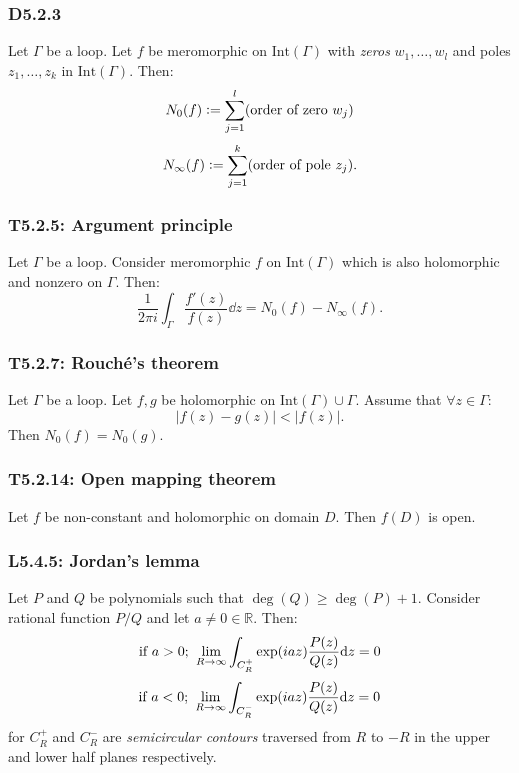 \documentclass{article}
\newcommand{\deq}{\vcentcolon=}
\begin{document}
\begin{multicols*}{3}
\subsubsection*{D5.2.3}
Let $\Gamma$ be a loop. Let $f$ be meromorphic on $\text{Int}(\Gamma)$
with \textit{zeros} $w_1,\dots,w_l$ and poles $z_1,\dots,z_k$ in
$\text{Int}(\Gamma)$. Then:
$$N_0(f)\deq\sum_{j=1}^{l}(\text{order of zero $w_j$})$$
$$N_\infty(f)\deq\sum_{j=1}^{k}(\text{order of pole $z_j$}).$$

\subsubsection*{T5.2.5: Argument principle}
Let $\Gamma$ be a loop. Consider meromorphic $f$ on $\text{Int}(\Gamma)$
which is also holomorphic and nonzero on $\Gamma$. Then:
$$\frac{1}{2\pi i}\int_{\Gamma}\frac{f'(z)}{f(z)}\dd z
=N_0(f)-N_\infty(f).$$

\subsubsection*{T5.2.7: Rouch\'e's theorem}
Let $\Gamma$ be a loop. Let $f,g$ be holomorphic on $\text{Int}(\Gamma)
\cup\Gamma$. Assume that $\forall z\in\Gamma$:
$$|f(z)-g(z)|<|f(z)|.$$
Then $N_0(f)=N_0(g)$.

\subsubsection*{T5.2.14: Open mapping theorem}
Let $f$ be non-constant and holomorphic on domain $D$.
Then $f(D)$ is open.

\subsubsection*{L5.4.5: Jordan's lemma}
Let $P$ and $Q$ be polynomials such that $\deg(Q)\geq\deg(P)+1$.
Consider rational function $P/Q$ and let $a\neq0\in\mathbb{R}$. Then:
$$\text{if $a>0$;}\hspace{0.05in}\lim_{R\rightarrow\infty}
\int_{C_R^+}\exp(iaz)\frac{P(z)}{Q(z)}\dd z=0$$
$$\text{if $a<0$;}\hspace{0.05in}\lim_{R\rightarrow\infty}
\int_{C_R^-}\exp(iaz)\frac{P(z)}{Q(z)}\dd z=0$$
for $C_R^+$ and $C_R^-$ are \textit{semicircular contours}
traversed from $R$ to $-R$ in the upper and lower half planes
respectively.


\end{multicols*}
\end{document}
